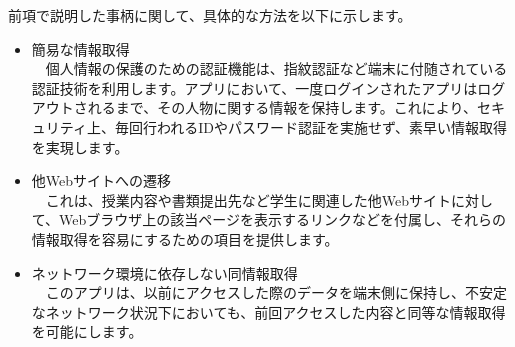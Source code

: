 前項で説明した事柄に関して、具体的な方法を以下に示します。
\begin{itemize}
\item 簡易な情報取得\\
　個人情報の保護のための認証機能は、指紋認証など端末に付随されている認証技術を利用します。アプリにおいて、一度ログインされたアプリはログアウトされるまで、その人物に関する情報を保持します。これにより、セキュリティ上、毎回行われるIDやパスワード認証を実施せず、素早い情報取得を実現します。
\item 他Webサイトへの遷移\\
　これは、授業内容や書類提出先など学生に関連した他Webサイトに対して、Webブラウザ上の該当ページを表示するリンクなどを付属し、それらの情報取得を容易にするための項目を提供します。
\item ネットワーク環境に依存しない同情報取得\\
　このアプリは、以前にアクセスした際のデータを端末側に保持し、不安定なネットワーク状況下においても、前回アクセスした内容と同等な情報取得を可能にします。
\end{itemize}
